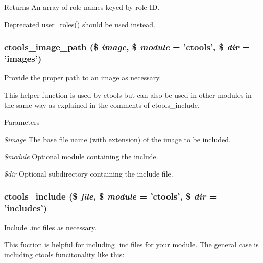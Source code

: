 \begin{DoxyReturn}{Returns}
An array of role names keyed by role ID.
\end{DoxyReturn}
\begin{Desc}
\item[\hyperlink{deprecated__deprecated000001}{Deprecated}]user\_\-roles() should be used instead. \end{Desc}
\hypertarget{ctools_8module_a8c2a362e0904c9014ef0bb33961cbd09}{
\subsubsection[{ctools\_\-image\_\-path}]{\setlength{\rightskip}{0pt plus 5cm}ctools\_\-image\_\-path (\$ {\em image}, \/  \$ {\em module} = {\ttfamily 'ctools'}, \/  \$ {\em dir} = {\ttfamily 'images'})}}
\label{ctools_8module_a8c2a362e0904c9014ef0bb33961cbd09}
Provide the proper path to an image as necessary.

This helper function is used by ctools but can also be used in other modules in the same way as explained in the comments of ctools\_\-include.


\begin{DoxyParams}{Parameters}
\item[{\em \$image}]The base file name (with extension) of the image to be included. \item[{\em \$module}]Optional module containing the include. \item[{\em \$dir}]Optional subdirectory containing the include file. \end{DoxyParams}
\hypertarget{ctools_8module_aab220ed5e60234f37c77bedbdb8a4905}{
\subsubsection[{ctools\_\-include}]{\setlength{\rightskip}{0pt plus 5cm}ctools\_\-include (\$ {\em file}, \/  \$ {\em module} = {\ttfamily 'ctools'}, \/  \$ {\em dir} = {\ttfamily 'includes'})}}
\label{ctools_8module_aab220ed5e60234f37c77bedbdb8a4905}
Include .inc files as necessary.

This fuction is helpful for including .inc files for your module. The general case is including ctools funcitonality like this:



